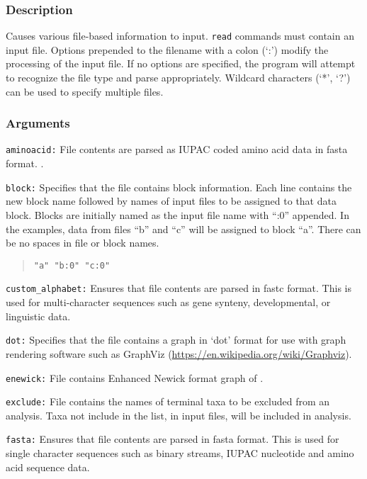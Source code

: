 \documentclass[11pt]{article}
\begin{document}
		\subsubsection{Description}
		Causes various file-based information to input.  \texttt{read} commands must contain an input file.
		Options prepended to the filename with a colon (`:') modify the processing of the input file. If no options are specified, 
		the program will attempt to recognize the file type and parse appropriately.  Wildcard characters (`*', `?') can be used to specify multiple files.
		\subsubsection{Arguments}
			\noindent \texttt{aminoacid:} File contents are parsed as IUPAC coded amino acid data in fasta \citep{PearsonandLipman1988} format. .
		
			\smallskip		
			\noindent \texttt{block:} Specifies that the file contains block information. Each line contains 
			the new block name followed by names of input files to be assigned to that data block.  
			Blocks are initially named as the input file name with ``:0'' appended.  
			In the examples, data from files ``b'' and ``c'' will be assigned to block ``a''.  There can be no spaces in file or block names.
			\begin{quote}
				\texttt{"a" "b:0" "c:0"}\\
			\end{quote}
			
			\smallskip		
			\noindent \texttt{custom\_alphabet:} Ensures that file contents are parsed in fastc \citep{WheelerandWashburn2019} format. This is used for multi-character sequences such as gene synteny, developmental,  or linguistic  data.
			
			\smallskip		
			\noindent \texttt{dot:} Specifies that the file contains a graph in `dot' format for use with graph rendering software such as GraphViz (\url{https://en.wikipedia.org/wiki/Graphviz}).
			
			\smallskip		
			\noindent \texttt{enewick:} File contains Enhanced Newick format graph of \cite{Cardonaetal2008}.
			
			\smallskip		
			\noindent \texttt{exclude:}  File contains the names of terminal taxa to be excluded from an analysis.  Taxa not include in the list, in input files, will be included in analysis. 
			
			\smallskip		
			\noindent \texttt{fasta:} Ensures that file contents are parsed in fasta \citep{PearsonandLipman1988} format. This is used for single character sequences such as binary streams, IUPAC nucleotide and amino acid sequence data.
			
\end{document}
